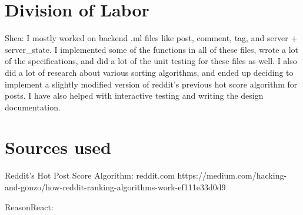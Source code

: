 \documentclass[11pt]{article}
\begin{document}
\section{Division of Labor}

Shea: I mostly worked on backend .ml files like post, comment, tag, and server + server_state. I implemented some of the functions in all of these files, wrote a lot of the specifications, and did a lot of the unit testing for these files as well. I also did a lot of research about various sorting algorithms, and ended up deciding to implement a slightly modified version of reddit's previous hot score algorithm for posts. I have also helped with interactive testing and writing the design documentation. 


\section{Sources used}

Reddit's Hot Post Score Algorithm:
reddit.com
https://medium.com/hacking-and-gonzo/how-reddit-ranking-algorithms-work-ef111e33d0d9

ReasonReact:
\end{document}
